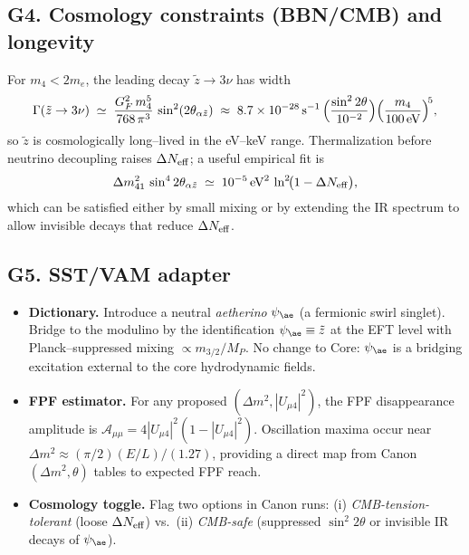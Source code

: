 \documentclass[11pt]{article}
\begin{document}
      \subsection*{G4. Cosmology constraints (BBN/CMB) and longevity}
          For $m_4<2m_e$, the leading decay $\tilde z\!\to\!3\nu$ has width
          \begin{equation}
          \Gamma(\tilde z\to 3\nu)\;\simeq\;
          \frac{G_F^2\,m_4^5}{768\,\pi^3}\,\sin^2(2\theta_{\alpha\tilde z})
          \;\approx\;
          8.7\times 10^{-28}\,\mathrm{s}^{-1}\,
          \Bigl(\frac{\sin^2 2\theta}{10^{-2}}\Bigr)
          \Bigl(\frac{m_4}{100\,\mathrm{eV}}\Bigr)^{\!5},
          \end{equation}
          so $\tilde z$ is cosmologically long--lived in the eV--keV range. Thermalization before neutrino decoupling raises $\Delta N_{\rm eff}$; a useful empirical fit is
          \begin{equation}
          \Delta m^2_{41}\,\sin^4 2\theta_{\alpha\tilde z}
          \;\simeq\;
          10^{-5}\,\mathrm{eV}^2\,
          \ln^2\!\bigl(1-\Delta N_{\rm eff}\bigr),
          \end{equation}
          which can be satisfied either by small mixing or by extending the IR spectrum to allow invisible decays that reduce $\Delta N_{\rm eff}$.

      \subsection*{G5. SST/VAM adapter}
          \begin{itemize}
          \item \textbf{Dictionary.} Introduce a neutral \emph{aetherino} $\psi_{\ae}$ (a fermionic swirl singlet). Bridge to the modulino by the identification $\psi_{\ae}\equiv\tilde z$ at the EFT level with Planck--suppressed mixing $\propto m_{3/2}/M_P$. No change to Core: $\psi_{\ae}$ is a bridging excitation external to the core hydrodynamic fields.
          \item \textbf{FPF estimator.} For any proposed $(\Delta m^2,|U_{\mu4}|^2)$, the FPF disappearance amplitude is
          $\mathcal A_{\mu\mu}=4|U_{\mu4}|^2(1-|U_{\mu4}|^2)$.
          Oscillation maxima occur near
          $\Delta m^2\!\approx\! (\pi/2)(E/L)/(1.27)$, providing a direct map from Canon $(\Delta m^2,\theta)$ tables to expected FPF reach.
          \item \textbf{Cosmology toggle.} Flag two options in Canon runs:
          (i) \emph{CMB-tension-tolerant} (loose $\Delta N_{\rm eff}$) vs.\ (ii) \emph{CMB-safe} (suppressed $\sin^2 2\theta$ or invisible IR decays of $\psi_{\ae}$).
          \end{itemize}
\end{document}
